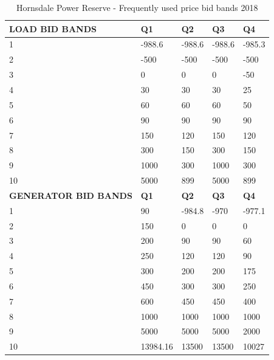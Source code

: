 \begin{center}
\begin{table}[]
\centering
\begin{tabular}{|l|l|l|l|l|}
\hline
\textbf{LOAD BID BANDS}      & \textbf{Q1} & \textbf{Q2} & \textbf{Q3} & \textbf{Q4} \\ \hline
1                  & -988.6      & -988.6      & -988.6      & -985.3      \\ \hline
2                  & -500        & -500        & -500        & -500        \\ \hline
3                  & 0           & 0           & 0           & -50         \\ \hline
4                  & 30          & 30          & 30          & 25          \\ \hline
5                  & 60          & 60          & 60          & 50          \\ \hline
6                  & 90          & 90          & 90          & 90          \\ \hline
7                  & 150         & 120         & 150         & 120         \\ \hline
8                  & 300         & 150         & 300         & 150         \\ \hline
9                  & 1000        & 300         & 1000        & 300         \\ \hline
10                 & 5000        & 899         & 5000        & 899         \\ \hline
\textbf{GENERATOR BID BANDS} & \textbf{Q1} & \textbf{Q2} & \textbf{Q3} & \textbf{Q4} \\ \hline
1                  & 90          & -984.8      & -970        & -977.1      \\ \hline
2                  & 150         & 0           & 0           & 0           \\ \hline
3                  & 200         & 90          & 90          & 60          \\ \hline
4                  & 250         & 120         & 120         & 90          \\ \hline
5                  & 300         & 200         & 200         & 175         \\ \hline
6                  & 450         & 300         & 300         & 250         \\ \hline
7                  & 600         & 450         & 450         & 400         \\ \hline
8                  & 1000        & 1000        & 1000        & 1000        \\ \hline
9                  & 5000        & 5000        & 5000        & 2000        \\ \hline
10                 & 13984.16    & 13500       & 13500       & 10027       \\ \hline
\end{tabular}
\caption{Hornsdale Power Reserve - Frequently used price bid bands 2018}
\end{table}
\label{tab:hpr_bid_bands}
\end{center}

